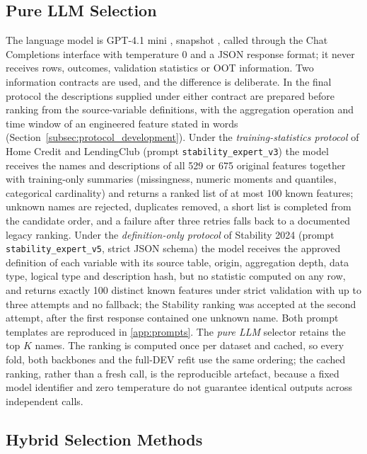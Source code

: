 \documentclass[final,5p,twocolumn]{elsarticle}
\newcommand{\Kfeat}{K}
\begin{document}
\subsection{Pure LLM Selection}
\label{subsec:llm_fs}

The language model is GPT-4.1 mini \cite{openai2025gpt41}, snapshot , called through the Chat Completions interface with temperature 0 and a JSON response format; it never receives rows, outcomes, validation statistics or OOT information. Two information contracts are used, and the difference is deliberate. In the final protocol the descriptions supplied under either contract are prepared before ranking from the source-variable definitions, with the aggregation operation and time window of an engineered feature stated in words (Section~\ref{subsec:protocol_development}). Under the \emph{training-statistics protocol} of Home Credit and LendingClub (prompt \texttt{stability\_expert\_v3}) the model receives the names and descriptions of all 529 or 675 original features together with training-only summaries (missingness, numeric moments and quantiles, categorical cardinality) and returns a ranked list of at most 100 known features; unknown names are rejected, duplicates removed, a short list is completed from the candidate order, and a failure after three retries falls back to a documented legacy ranking. Under the \emph{definition-only protocol} of Stability 2024 (prompt \texttt{stability\_expert\_v5}, strict JSON schema) the model receives the approved definition of each variable with its source table, origin, aggregation depth, data type, logical type and description hash, but no statistic computed on any row, and returns exactly 100 distinct known features under strict validation with up to three attempts and no fallback; the Stability ranking was accepted at the second attempt, after the first response contained one unknown name. Both prompt templates are reproduced in \ref{app:prompts}. The \emph{pure LLM} selector retains the top $\Kfeat$ names. The ranking is computed once per dataset and cached, so every fold, both backbones and the full-DEV refit use the same ordering; the cached ranking, rather than a fresh call, is the reproducible artefact, because a fixed model identifier and zero temperature do not guarantee identical outputs across independent calls.

\subsection{Hybrid Selection Methods}
\label{subsec:hybrid_fs}
\end{document}
